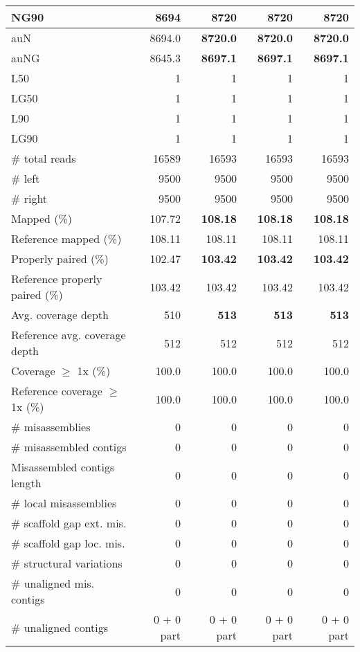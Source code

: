\documentclass[12pt,a4paper]{article}
\begin{document}
\begin{table}[ht]
\begin{center}
\begin{tabular}{|l*{4}{|r}|}
NG90 & 8694 & {\bf 8720} & {\bf 8720} & {\bf 8720} \\ \hline
auN & 8694.0 & {\bf 8720.0} & {\bf 8720.0} & {\bf 8720.0} \\ \hline
auNG & 8645.3 & {\bf 8697.1} & {\bf 8697.1} & {\bf 8697.1} \\ \hline
L50 & 1 & 1 & 1 & 1 \\ \hline
LG50 & 1 & 1 & 1 & 1 \\ \hline
L90 & 1 & 1 & 1 & 1 \\ \hline
LG90 & 1 & 1 & 1 & 1 \\ \hline
\# total reads & 16589 & 16593 & 16593 & 16593 \\ \hline
\# left & 9500 & 9500 & 9500 & 9500 \\ \hline
\# right & 9500 & 9500 & 9500 & 9500 \\ \hline
Mapped (\%) & 107.72 & {\bf 108.18} & {\bf 108.18} & {\bf 108.18} \\ \hline
Reference mapped (\%) & 108.11 & 108.11 & 108.11 & 108.11 \\ \hline
Properly paired (\%) & 102.47 & {\bf 103.42} & {\bf 103.42} & {\bf 103.42} \\ \hline
Reference properly paired (\%) & 103.42 & 103.42 & 103.42 & 103.42 \\ \hline
Avg. coverage depth & 510 & {\bf 513} & {\bf 513} & {\bf 513} \\ \hline
Reference avg. coverage depth & 512 & 512 & 512 & 512 \\ \hline
Coverage $\geq$ 1x (\%) & 100.0 & 100.0 & 100.0 & 100.0 \\ \hline
Reference coverage $\geq$ 1x (\%) & 100.0 & 100.0 & 100.0 & 100.0 \\ \hline
\# misassemblies & 0 & 0 & 0 & 0 \\ \hline
\# misassembled contigs & 0 & 0 & 0 & 0 \\ \hline
Misassembled contigs length & 0 & 0 & 0 & 0 \\ \hline
\# local misassemblies & 0 & 0 & 0 & 0 \\ \hline
\# scaffold gap ext. mis. & 0 & 0 & 0 & 0 \\ \hline
\# scaffold gap loc. mis. & 0 & 0 & 0 & 0 \\ \hline
\# structural variations & 0 & 0 & 0 & 0 \\ \hline
\# unaligned mis. contigs & 0 & 0 & 0 & 0 \\ \hline
\# unaligned contigs & 0 + 0 part & 0 + 0 part & 0 + 0 part & 0 + 0 part \\ \hline

\end{tabular}
\end{center}
\end{table}
\end{document}
